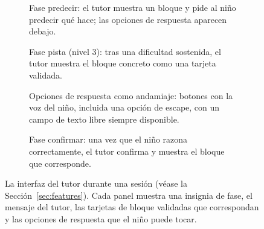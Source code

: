 \documentclass[conference]{IEEEtran}
\begin{document}
\begin{figure}[!t]
\centering
\begin{subfigure}[t]{0.48\textwidth}
  \centering
  \fbox{\rule{0pt}{42mm}\rule{0.9\linewidth}{0pt}} %
  \caption{Fase predecir: el tutor muestra un bloque y pide al niño predecir qué hace; las opciones de respuesta aparecen debajo.}
  \label{fig:ui-predict}
\end{subfigure}
\hfill
\begin{subfigure}[t]{0.48\textwidth}
  \centering
  \fbox{\rule{0pt}{42mm}\rule{0.9\linewidth}{0pt}} %
  \caption{Fase pista (nivel 3): tras una dificultad sostenida, el tutor muestra el bloque concreto como una tarjeta validada.}
  \label{fig:ui-hint}
\end{subfigure}

\vspace{3mm}

\begin{subfigure}[t]{0.48\textwidth}
  \centering
  \fbox{\rule{0pt}{42mm}\rule{0.9\linewidth}{0pt}} %
  \caption{Opciones de respuesta como andamiaje: botones con la voz del niño, incluida una opción de escape, con un campo de texto libre siempre disponible.}
  \label{fig:ui-options}
\end{subfigure}
\hfill
\begin{subfigure}[t]{0.48\textwidth}
  \centering
  \fbox{\rule{0pt}{42mm}\rule{0.9\linewidth}{0pt}} %
  \caption{Fase confirmar: una vez que el niño razona correctamente, el tutor confirma y muestra el bloque que corresponde.}
  \label{fig:ui-confirm}
\end{subfigure}
\caption{La interfaz del tutor durante una sesión (véase la Sección~\ref{sec:features}). Cada panel muestra una insignia de fase, el mensaje del tutor, las tarjetas de bloque validadas que correspondan y las opciones de respuesta que el niño puede tocar.}
\label{fig:ui}
\end{figure}
\end{document}
